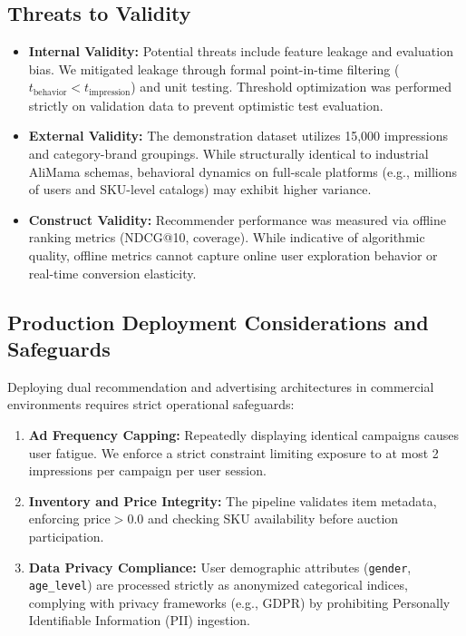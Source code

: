 \documentclass[10pt,a4paper,twoside]{article}
\begin{document}
\subsection{Threats to Validity}
\begin{itemize}
    \item \textbf{Internal Validity:} Potential threats include feature leakage and evaluation bias. We mitigated leakage through formal point-in-time filtering ($t_{\text{behavior}} < t_{\text{impression}}$) and unit testing. Threshold optimization was performed strictly on validation data to prevent optimistic test evaluation.
    \item \textbf{External Validity:} The demonstration dataset utilizes 15,000 impressions and category-brand groupings. While structurally identical to industrial AliMama schemas, behavioral dynamics on full-scale platforms (e.g., millions of users and SKU-level catalogs) may exhibit higher variance.
    \item \textbf{Construct Validity:} Recommender performance was measured via offline ranking metrics (NDCG@10, coverage). While indicative of algorithmic quality, offline metrics cannot capture online user exploration behavior or real-time conversion elasticity.
\end{itemize}

\subsection{Production Deployment Considerations and Safeguards}
Deploying dual recommendation and advertising architectures in commercial environments requires strict operational safeguards:
\begin{enumerate}
    \item \textbf{Ad Frequency Capping:} Repeatedly displaying identical campaigns causes user fatigue. We enforce a strict constraint limiting exposure to at most 2 impressions per campaign per user session.
    \item \textbf{Inventory and Price Integrity:} The pipeline validates item metadata, enforcing $\text{price} > 0.0$ and checking SKU availability before auction participation.
    \item \textbf{Data Privacy Compliance:} User demographic attributes (\texttt{gender}, \texttt{age\_level}) are processed strictly as anonymized categorical indices, complying with privacy frameworks (e.g., GDPR) by prohibiting Personally Identifiable Information (PII) ingestion.
\end{enumerate}
\end{document}
